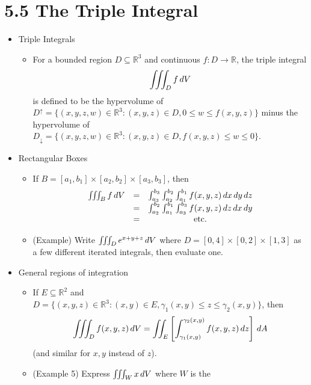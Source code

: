 \documentclass[11pt]{article}
\begin{document}
\section*{5.5 The Triple Integral}

\begin{itemize}
  \item Triple Integrals
    \begin{itemize}
      \item
      For a bounded region \(D\subseteq\mathbb R^3\) and continuous
      \(f:D\to\mathbb R\), the triple integral
        \[
          \iiint_D f\,d V
        \]
      is defined to be the hypervolume of
      \(D^\uparrow=\{(x,y,z,w)\in\mathbb R^3:(x,y,z)\in D,0\leq w\leq f(x,y,z)\}\)
      minus the hypervolume of
      \(D_\downarrow=\{(x,y,z,w)\in\mathbb R^3:(x,y,z)\in D,f(x,y,z)\leq w\leq 0\}\).
    \end{itemize}
  \item Rectangular Boxes
    \begin{itemize}
      \item
      If \(B=[a_1,b_1]\times[a_2,b_2]\times[a_3,b_3]\), then
        \[
          \begin{matrix}
            \iiint_B f\,d V
              & = &
            \int_{a_3}^{b_3}\int_{a_2}^{b_2}\int_{a_1}^{b_1}
            f(x,y,z) \,d x\,d y\,d z
              \\ & = &
            \int_{a_2}^{b_2}\int_{a_1}^{b_1}\int_{a_3}^{b_3}
            f(x,y,z) \,d z\,d x\,d y
              \\ & = &
            \text{etc.}
          \end{matrix}
        \]
      \item
      (Example)
      Write \(\iiint_D e^{x+y+z}\,d V\) where
      \(D=[0,4]\times[0,2]\times[1,3]\) as a few different iterated integrals,
      then evaluate one.
    \end{itemize}
  \item General regions of integration
    \begin{itemize}
      \item
      If \(E\subseteq\mathbb R^2\) and
      \(D=\{(x,y,z)\in\mathbb R^3:(x,y)\in E,\gamma_1(x,y)\leq z\leq\gamma_2(x,y)\}\),
      then
      \[
        \iiint_D f(x,y,z)\,d V
          =
        \iint_E
          \left[\int_{\gamma_1(x,y)}^{\gamma_2(x,y)} f(x,y,z)\,d z\right]
        \,d A
      \]
      (and similar for \(x,y\) instead of \(z\)).
      \item (Example 5) Express \(\iiint_W x\,d V\) where \(W\) is the

\end{itemize}
\end{itemize}
\end{document}
